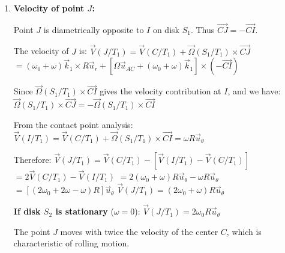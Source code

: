 \documentclass[12pt]{article}
\begin{document}
\begin{correctionbox}
\begin{enumerate}
    Expanding and comparing tangential components:
    $(\omega_0 + \omega)R - \Omega r = \omega R$
    
    Simplifying:
    $\omega_0 R = \Omega r$
    
    Therefore:
    $\boxed{\Omega = \frac{\omega_0 R}{r}}$
    
    Or including the motion of $S_2$:
    $\boxed{\Omega = \frac{(\omega_0 + \omega)R - \omega R}{r} = \frac{\omega_0 R}{r}}$
    
    \item \textbf{Velocity of point $J$:}
    
    Point $J$ is diametrically opposite to $I$ on disk $S_1$. Thus $\overrightarrow{CJ} = -\overrightarrow{CI}$.
    
    The velocity of $J$ is:
    $\vec{V}(J/T_1) = \vec{V}(C/T_1) + \vec{\Omega}(S_1/T_1) \times \overrightarrow{CJ}$
    $= (\omega_0 + \omega) \vec{k}_1 \times R\vec{u}_r + [\Omega \vec{u}_{AC} + (\omega_0 + \omega) \vec{k}_1] \times (-\overrightarrow{CI})$
    
    Since $\vec{\Omega}(S_1/T_1) \times \overrightarrow{CI}$ gives the velocity contribution at $I$, and we have:
    $\vec{\Omega}(S_1/T_1) \times \overrightarrow{CJ} = -\vec{\Omega}(S_1/T_1) \times \overrightarrow{CI}$
    
    From the contact point analysis:
    $\vec{V}(I/T_1) = \vec{V}(C/T_1) + \vec{\Omega}(S_1/T_1) \times \overrightarrow{CI} = \omega R \vec{u}_{\theta}$
    
    Therefore:
    $\vec{V}(J/T_1) = \vec{V}(C/T_1) - [\vec{V}(I/T_1) - \vec{V}(C/T_1)]$
    $= 2\vec{V}(C/T_1) - \vec{V}(I/T_1)$
    $= 2(\omega_0 + \omega)R\vec{u}_{\theta} - \omega R\vec{u}_{\theta}$
    $= [(2\omega_0 + 2\omega - \omega)R]\vec{u}_{\theta}$
    $\boxed{\vec{V}(J/T_1) = (2\omega_0 + \omega)R\vec{u}_{\theta}}$
    
    \textbf{If disk $S_2$ is stationary} ($\omega = 0$):
    $\boxed{\vec{V}(J/T_1) = 2\omega_0 R\vec{u}_{\theta}}$
    
    The point $J$ moves with twice the velocity of the center $C$, which is characteristic of rolling motion.
\end{enumerate}
\end{correctionbox}
\end{document}
